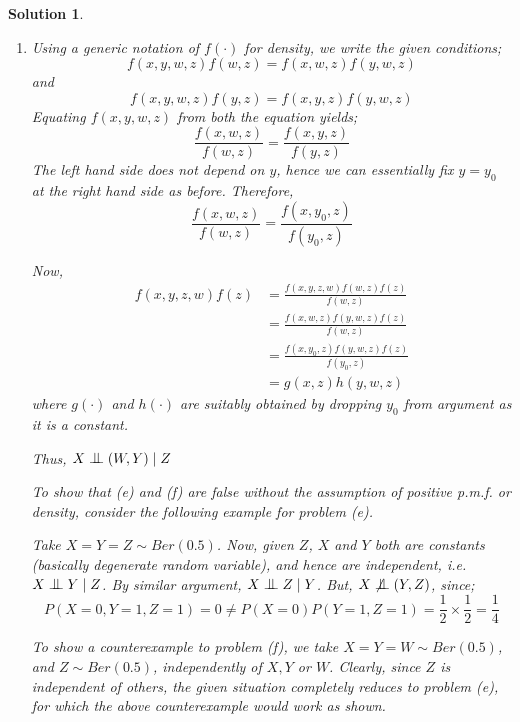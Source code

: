 \documentclass[12pt]{article}
\theoremstyle{problemstyle}
\newtheorem*{solution*}{Solution}
\newcommand{\indep}{\mathrel{\text{\scalebox{1.07}{$\perp\mkern-10mu\perp$}}}}
\begin{document}
\begin{solution*}
\begin{enumerate}
	
	\item[(f)] Using a generic notation of $f(\cdot)$ for density, we write the given conditions;
	$$f(x, y, w, z)f(w, z) = f(x, w, z)f(y, w, z)$$
	and
	$$f(x, y, w, z)f(y, z) = f(x, y, z)f(y, w, z)$$
	Equating $f(x, y, w, z)$ from both the equation yields;
	$$\frac{f(x, w, z)}{f(w, z)} = \frac{f(x, y, z)}{f(y, z)}$$
	The left hand side does not depend on $y$, hence we can essentially fix $y = y_0$ at the right hand side as before. Therefore,
	$$\frac{f(x, w, z)}{f(w, z)} = \frac{f(x, y_0, z)}{f(y_0, z)}$$
	
	Now,
	\begin{align*}
		f(x, y, z, w) f(z) & = \frac{f(x, y, z, w)f(w, z)f(z)}{f(w, z)}\\
		& = \frac{f(x, w, z)f(y, w, z)f(z)}{f(w, z)}\\
		& = \frac{f(x, y_0, z)f(y, w, z)f(z)}{f(y_0, z)}\\
		& = g(x, z)h(y, w, z)
	\end{align*}
	where $g(\cdot)$ and $h(\cdot)$ are suitably obtained by dropping $y_0$ from argument as it is a constant.
	
	Thus, $X \indep (W, Y) \mid Z$
	
	
	
	
	To show that (e) and (f) are false without the assumption of positive p.m.f. or density, consider the following example for problem (e).
	
	Take $X = Y = Z \sim Ber(0.5)$. Now, given $Z$, $X$ and $Y$ both are constants (basically degenerate random variable), and hence are independent, i.e. $X \indep Y \mid Z$. By similar argument, $X \indep Z \mid Y$. But, $X \not\indep (Y, Z)$, since;
	$$P(X = 0, Y = 1, Z = 1) = 0 \neq P(X = 0)P(Y = 1, Z = 1) = \frac{1}{2} \times \frac{1}{2} = \frac{1}{4}$$ 
	
	To show a counterexample to problem (f), we take $X = Y = W \sim Ber(0.5)$, and $Z \sim Ber(0.5)$, independently of $X, Y$ or $W$. Clearly, since $Z$ is independent of others, the given situation completely reduces to problem (e), for which the above counterexample would work as shown.
	
	
	
\end{enumerate}
\end{solution*}
\vskip3pt
\end{document}
